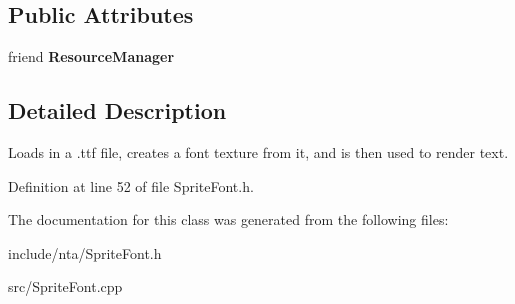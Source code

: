 \subsection*{Public Attributes}
\begin{DoxyCompactItemize}
\item 
\mbox{\label{classnta_1_1SpriteFont_a1db301b9555c86340ea57bb2c5485dfc}} 
friend {\bfseries Resource\+Manager}
\end{DoxyCompactItemize}


\subsection{Detailed Description}
Loads in a .ttf file, creates a font texture from it, and is then used to render text. 

Definition at line 52 of file Sprite\+Font.\+h.



The documentation for this class was generated from the following files\+:\begin{DoxyCompactItemize}
\item 
include/nta/Sprite\+Font.\+h\item 
src/Sprite\+Font.\+cpp\end{DoxyCompactItemize}
